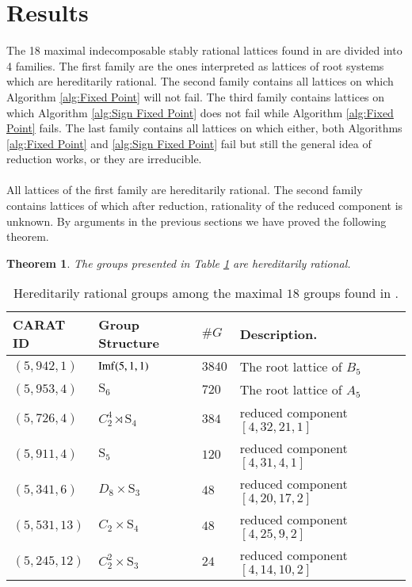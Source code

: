 \documentclass[a4paper, 14pt]{extarticle}
\theoremstyle{plain}
\newtheorem{theorem}{Theorem}
\theoremstyle{definition}
\begin{document}
\section{Results}\label{conc}
The 18 maximal indecomposable stably rational lattices found in \cite{Hoshi} are divided into 4 families. The first family are the ones interpreted as lattices of root systems which are hereditarily rational. The second family contains all lattices on which Algorithm \ref{alg:Fixed Point} will not fail. The third family contains lattices on which  Algorithm \ref{alg:Sign Fixed Point} does not fail while Algorithm \ref{alg:Fixed Point} fails. The last family contains all lattices on which either, both Algorithms \ref{alg:Fixed Point} and \ref{alg:Sign Fixed Point} fail but still the general idea of reduction works, or they are irreducible.\\
\\
All lattices of the first family are hereditarily rational. The second family contains lattices of which after reduction, rationality of the reduced component is unknown. By arguments in the previous sections we have proved the following theorem.
\begin{theorem}
The groups presented in Table \ref{Tbl:Rational} are hereditarily rational.
\end{theorem}
 \begin{table}[H]  
\centering
\begin{tabular}{lllll}
CARAT ID & Group Structure & $\#G$ & Description.\\\hline
$(5,942,1)$ & ${\rm Imf}(5,1,1)$ & $3840$ & The root lattice of $B_5$ \\
 $(5,953,4)$ & $\mathrm{S}_6$ & $720$ &  The root lattice of $A_5$ \\
 $(5,726,4)$ & $C_2^4\rtimes \mathrm{S}_4$ & $384$   & reduced component $[4,32,21,1]$  \\
$(5,911,4)$ & $\mathrm{S}_5$ & $120$  & reduced component $[ 4, 31, 4, 1 ]$  \\
 $(5,341,6)$ & $D_8\times \mathrm{S}_3$ & $48$  & reduced component $[ 4, 20, 17, 2 ]$ &\\
 $(5,531,13)$ & $C_2\times \mathrm{S}_4$ & $48$  & reduced component $[ 4, 25, 9, 2 ]$ &\\
 $(5,245,12)$ & $C_2^2\times \mathrm{S}_3$ & $24$ &reduced component $[ 4, 14, 10, 2 ]$&
\end{tabular}
\caption{Hereditarily rational groups among the maximal $18$ groups 
found in \cite{Hoshi}.}
\label{Tbl:Rational}
\end{table}
\end{document}
